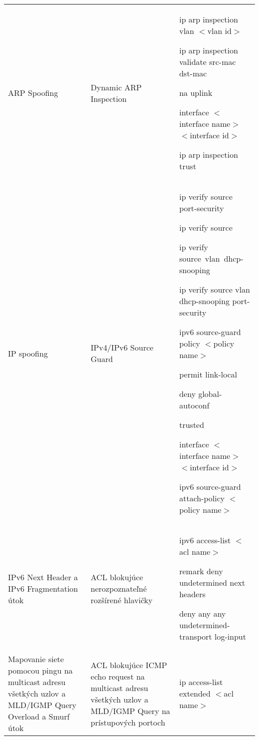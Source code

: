 \begin{longtable}[!htbp]{|L{10em}L{10em}>{\selectfont}L{34em}|}
	
	
	 ARP Spoofing	&Dynamic ARP Inspection	&ip arp inspection vlan $<$vlan id$>$
	 
	ip arp inspection validate src-mac dst-mac 
	
	\hspace{0.5em}
	
	{\selectfont na uplink}
	
	interface $<$interface name$>$ $<$interface id$>$
	
	\hspace{0.5em}ip arp inspection trust\\
	
	
	
	
	IP spoofing	&IPv4/IPv6 Source Guard	&ip verify source port-security
	
	ip verify source
	
	ip verify source vlan dhcp-snooping
	
	ip verify source vlan dhcp-snooping port-security
	
	ipv6 source-guard policy $<$policy name$>$
	
	\hspace{0.5em}permit link-local
	
	\hspace{0.5em}deny global-autoconf
	
	\hspace{0.5em}trusted
	
	interface $<$interface name$>$ $<$interface id$>$
	
	\hspace{0.5em}ipv6 source-guard attach-policy $<$policy name$>$\\
	
	
	
	
	IPv6 Next Header  a IPv6 Fragmentation útok	&ACL blokujúce nerozpoznateľné rozšírené hlavičky	&ipv6 access-list $<$acl name$>$
	
	\hspace{0.5em}remark deny undetermined next headers
	
	\hspace{0.5em}deny any any undetermined-transport log-input\\
	
	
	
	
	Mapovanie siete pomocou pingu na multicast adresu všetkých uzlov a MLD/IGMP Query Overload a Smurf útok	& ACL blokujúce ICMP echo request na multicast adresu všetkých uzlov a MLD/IGMP Query na prístupových portoch	&ip access-list extended $<$acl name$>$
	

\end{longtable}
